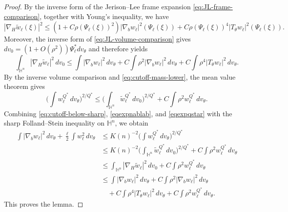\documentclass[11pt]{article}
\numberwithin{equation}{section}
\numberwithin{equation}{section}
\begin{document}
\begin{proof}
By the inverse form of the Jerison--Lee frame expansion \eqref{eq:JL-frame-comparison}, together with
Young's inequality, we have
\[
|\nabla_H\widetilde w_\ell(\xi)|^2
\le
(1+C\rho(\Psi_\ell(\xi))^2)
|\nabla_bw_\ell|^2(\Psi_\ell(\xi))
+
C\rho(\Psi_\ell(\xi))^4
|T_\theta w_\ell|^2(\Psi_\ell(\xi)).
\]
Moreover, the inverse form of \eqref{eq:JL-volume-comparison} gives
\(
dv_0=(1+O(\rho^2))\Psi_\ell^*dv_\theta
\)
and therefore yields
\begin{equation}\label{eqexpnablab}
\int_{\mathbb H^n}|\nabla_H\widetilde w_\ell|^2\,dv_0
\le
\int |\nabla_bw_\ell|^2\,dv_\theta
+
C\int \rho^2|\nabla_bw_\ell|^2\,dv_\theta  
+
C\int \rho^4|T_\theta w_\ell|^2\,dv_\theta .
\end{equation}
By the inverse volume comparison and
\eqref{eq:cutoff-mass-lower}, the mean value theorem gives
\begin{equation}\label{eqexpqstar}
\Big(\int w_\ell^{Q^*}\,dv_\theta\Big)^{2/Q^*}
\le
\Big(\int_{\mathbb H^n}
\widetilde w_\ell^{Q^*}\,dv_0\Big)^{2/Q^*}+
C\int\rho^2w_\ell^{Q^*}\,dv_\theta.
\end{equation}
Combining \eqref{eq:cutoff-below-sharp},
\eqref{eqexpnablab}, and \eqref{eqexpqstar} with the sharp
Folland--Stein inequality on \(\mathbb H^n\), we obtain
\[
\begin{aligned}
\int |\nabla_bw_\ell|^2\,dv_\theta
+\frac{\ell}{2}\int w_\ell^2\,dv_\theta
&\le
K(n)^{-2}
\Big(\int w_\ell^{Q^*}\,dv_\theta\Big)^{2/Q^*} \\
&\le
K(n)^{-2}
\Big(\int_{\mathbb H^n}\widetilde w_\ell^{Q^*}\,dv_0\Big)^{2/Q^*}
+
C\int\rho^2w_\ell^{Q^*}\,dv_\theta \\
&\le
\int_{\mathbb H^n}|\nabla_H\widetilde w_\ell|^2\,dv_0
+
C\int\rho^2w_\ell^{Q^*}\,dv_\theta \\
&\le
\int |\nabla_bw_\ell|^2\,dv_\theta
+
C\int\rho^2|\nabla_bw_\ell|^2\,dv_\theta \\
&\quad
+
C\int\rho^4|T_\theta w_\ell|^2\,dv_\theta
+
C\int\rho^2w_\ell^{Q^*}\,dv_\theta .
\end{aligned}
\]
This proves the lemma.
\end{proof}
\end{document}
